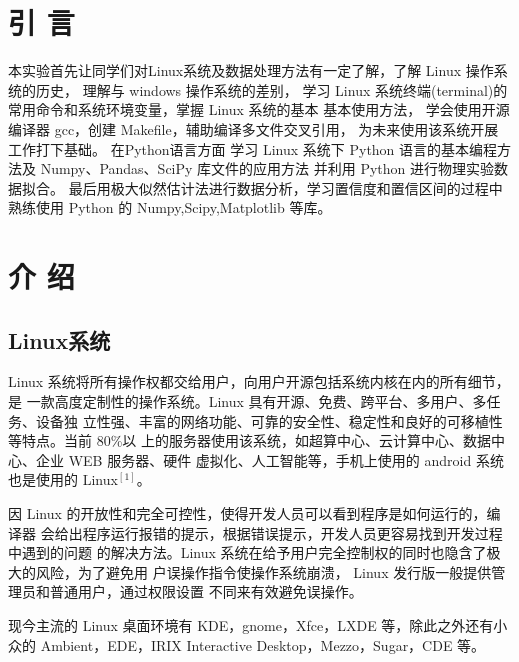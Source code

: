 \documentclass[10pt,a4paper,twoside,UTF8]{ctexart}
\begin{document}


\thispagestyle{firstpage}%
\pagestyle{maincontent}%





\section{引 \quad 言}
本实验首先让同学们对Linux系统及数据处理方法有一定了解，了解 Linux 操作系统的历史，
理解与 windows 操作系统的差别，
学习 Linux 系统终端(terminal)的常用命令和系统环境变量，掌握 Linux 系统的基本
基本使用方法，
学会使用开源编译器 gcc，创建 Makefile，辅助编译多文件交叉引用，
为未来使用该系统开展工作打下基础。
在Python语言方面
学习 Linux 系统下 Python 语言的基本编程方法及
Numpy、Pandas、SciPy 库文件的应用方法
并利用 Python 进行物理实验数据拟合。
最后用极大似然估计法进行数据分析，学习置信度和置信区间的过程中熟练使用 Python 的 Numpy,Scipy,Matplotlib 等库。

\section{介 \quad 绍}
\subsection{Linux系统}
Linux 系统将所有操作权都交给用户，向用户开源包括系统内核在内的所有细节，是
一款高度定制性的操作系统。Linux 具有开源、免费、跨平台、多用户、多任务、设备独
立性强、丰富的网络功能、可靠的安全性、稳定性和良好的可移植性等特点。当前 80\%以
上的服务器使用该系统，如超算中心、云计算中心、数据中心、企业 WEB 服务器、硬件
虚拟化、人工智能等，手机上使用的 android 系统也是使用的 Linux$^{[1]}$。

因 Linux 的开放性和完全可控性，使得开发人员可以看到程序是如何运行的，编译器
会给出程序运行报错的提示，根据错误提示，开发人员更容易找到开发过程中遇到的问题
的解决方法。Linux 系统在给予用户完全控制权的同时也隐含了极大的风险，为了避免用
户误操作指令使操作系统崩溃， Linux 发行版一般提供管理员和普通用户，通过权限设置
不同来有效避免误操作。

现今主流的 Linux 桌面环境有 KDE，gnome，Xfce，LXDE 等，除此之外还有小众的
Ambient，EDE，IRIX Interactive Desktop，Mezzo，Sugar，CDE 等。
\end{document}
